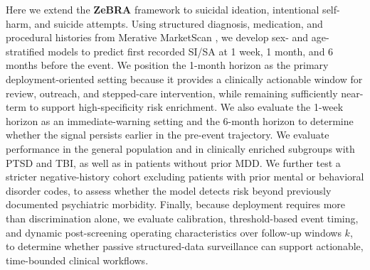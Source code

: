 \documentclass[onecolumn, compsoc,11pt]{IEEEtran}
\def\zebra{\textbf{ZeBRA}\xspace}
\begin{document}
Here we extend the \zebra framework to suicidal ideation, intentional self-harm, and suicide attempts. Using structured diagnosis, medication, and procedural histories from Merative MarketScan \cite{hansen2017truven}, we develop sex- and age-stratified models to predict first recorded SI/SA at 1 week, 1 month, and 6 months before the event. We position the 1-month horizon as the primary deployment-oriented setting because it provides a clinically actionable window for review, outreach, and stepped-care intervention, while remaining sufficiently near-term to support high-specificity risk enrichment. We also evaluate the 1-week horizon as an immediate-warning setting and the 6-month horizon to determine whether the signal persists earlier in the pre-event trajectory. We evaluate performance in the general population and in clinically enriched subgroups with PTSD and TBI, as well as in patients without prior MDD. We further test a stricter negative-history cohort excluding patients with prior mental or behavioral disorder codes, to assess whether the model detects risk beyond previously documented psychiatric morbidity. Finally, because deployment requires more than discrimination alone, we evaluate calibration, threshold-based event timing, and dynamic post-screening operating characteristics over follow-up windows \(k\), to determine whether passive structured-data surveillance can support actionable, time-bounded clinical workflows.
\end{document}
